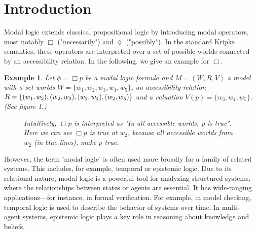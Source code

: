 \documentclass[12pt, a4paper]{scrartcl}
\newtheorem{example}[definition]{Example}
\begin{document}
\section{Introduction}
Modal logic extends classical propositional logic by introducing modal operators, most notably $\Box$ ("necessarily") and $\lozenge$ ("possibly"). In the standard Kripke semantics, 
these operators are interpreted over a set of possible worlds connected by an accessibility relation. In the following, we give an example for $\Box$.
\begin{example}
    Let $\phi = \Box p$ be a modal logic formula and $M = (W,R,V)$ a model with  a set worlds $W = \{w_1,w_2,w_3,w_4,w_5\}$, 
    an accessibility relation $R = \{(w_1,w_2), (w_2,w_3), \newline
     (w_2,w_4), (w_2,w_5)\}$ and a valuation $V(p) = \{w_3,w_4,w_5\}$. (See figure 1.)
        \begin{figure}[h]
        \centering
        \caption{Intuitively, $\Box p$ is interpreted as "In all accessible worlds, p is true".
        Here we can see $\Box p$ is true at $w_2$, because all accessible worlds from $w_2$ (in blue lines), make $p$ true.}
        \end{figure} 
\end{example}
However, the term 'modal logic' is often used more broadly for a family of related systems. This includes, for example,
temporal or epistemic logic. Due to its relational nature, modal logic is a powerful tool for analyzing structured systems, where the relationships between states or agents are essential. 
It has wide-ranging applications—for instance, in formal verification. For example, in model checking, temporal logic is used to describe the behavior of systems over time. In multi-agent systems, epistemic logic plays a key role in reasoning about knowledge and beliefs.
\end{document}
